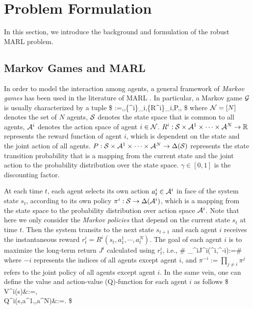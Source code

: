 


\section{Problem Formulation}\label{sec:background}

In this section, we introduce the background and formulation of the robust MARL problem. 


\subsection{Markov Games and MARL}\label{sec:MARL_form} 
In order to model the interaction among agents, a general framework of \emph{Markov games} has been used  in the literature of MARL \citep{littman1994markov}. 
In particular, a Markov game $\mathcal{G}$ is usually characterized by a tuple 
\$
\cG:=\la\cN,\cS,\{\cA^i\}_{i\in\cN},\{R^i\}_{i\in\cN},P,\gamma\ra,
\$
 where $\mathcal{N}=[N]$ denotes the set of $N$ agents, ${\mathcal{S}}$ denotes the state space that is common to all agents, $\mathcal{A}^i$ denotes the action space of agent $i\in\mathcal{N}$. $R^i:{\mathcal{S}}\times\mathcal{A}^1\times\cdots\times\mathcal{A}^N\to \mathbb{R}$ represents the reward function of agent $i$, which is dependent on the state and the joint action of all agents.   $P:{\mathcal{S}}\times\mathcal{A}^1\times\cdots\times\mathcal{A}^N\to\Delta({\mathcal{S}})$ represents the state transition probability that is a mapping from the current state and the joint action to the probability distribution over the state space.  $\gamma\in[0,1]$ is the discounting factor. 
 
 
At each time $t$, 
each agent  selects its own action $a^i_t\in\mathcal{A}^i$ in face of the  system state $s_t$, according to its own policy $\pi^i:{\mathcal{S}}\to \Delta(\mathcal{A}^i)$, which is a mapping from the state space to the probability distribution over action space $\mathcal{A}^i$.
Note that here we only consider the \emph{Markov policies} that depend on the current state $s_t$ at time $t$. 
 Then the system transits to the next state $s_{t+1}$ and each agent $i$ receives the instantaneous reward $r^i_t=R^i(s_t,a^1_1,\cdots,a^N_t)$. The goal of each agent $i$ is to maximize the long-term return $J^i$ calculated using $r^i_t$, i.e., 
\#\label{equ:def_return_i} 
\max_{\pi^i}\quad J^i(\pi^i,\pi^{-i}):=\EE\bigg[\sum_{t=0}^\infty \gamma^tr^i_t\bigggiven s_0,a^i_t\sim\pi^i(\cdot\given s_t)\bigg]
\#
where  $-i$ represents the indices of all agents except agent $i$, and 
$\pi^{-i}:=\prod_{j\neq i}\pi^j$ refers to the joint policy of all agents except agent $i$. 
In the same vein, one can define the value and action-value (Q)-function for each agent $i$ as follows 
\$
V^i(s)&:=\EE\bigg[\sum_{t=0}^\infty \gamma^tr^i_t\bigggiven s_0=s,a^i_t\sim\pi^i(\cdot\given s_t)\bigg], \\ Q^i(s,a^1,\cdots,a^N)&:=\EE\bigg[\sum_{t=0}^\infty \gamma^tr^i_t\bigggiven s_0=s,a^i_0=a^i,a^i_t\sim\pi^i(\cdot\given s_t)\bigg]. 
\$ 




